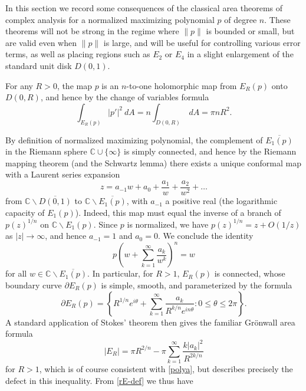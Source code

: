 \documentclass[12pt]{amsart}
\newcommand{\C}{\mathbb{C}}
\begin{document}
In this section we record some consequences of the classical area theorems of complex analysis for a normalized maximizing polynomial $p$ of degree $n$.  These theorems will not be strong in the regime where $\|p\|$ is bounded or small, but are valid even when $\|p\|$ is large, and will be useful for controlling various error terms, as well as placing regions such as $E_2$ or $E_4$ in a slight enlargement of the standard unit disk $D(0,1)$.

For any $R>0$, the map $p$ is an $n$-to-one holomorphic map from $E_R(p)$ onto $D(0,R)$, and hence by the change of variables formula
\begin{equation}\label{area-form}
    \int_{E_R(p)} |p'|^2\ dA = n \int_{D(0,R)}\ dA = \pi n R^2.
\end{equation}

By definition of normalized maximizing polynomial, the complement of $\overline{E_1(p)}$ in the Riemann sphere $\C \cup \{\infty\}$ is simply connected, and hence by the Riemann mapping theorem (and the Schwartz lemma) there exists a unique conformal map with a Laurent series expansion
$$ z = a_{-1} w + a_0 + \frac{a_1}{w} + \frac{a_2}{w^2} + \dots$$
from $\C \backslash \overline{D(0,1)}$ to $\C \backslash \overline{E_1(p)}$, with $a_{-1}$ a positive real (the logarithmic capacity of $E_1(p)$).  Indeed, this map must equal the inverse of a branch of $p(z)^{1/n}$ on $\C \backslash E_1(p)$.  Since $p$ is normalized, we have $p(z)^{1/n} = z + O(1/z)$ as $|z| \to \infty$, and hence $a_{-1}=1$ and $a_0=0$.  We conclude the identity
\begin{equation}\label{p-power}
 p\left( w + \sum_{k=1}^\infty \frac{a_k}{w^k} \right)^n = w
\end{equation}
for all $w \in \C \backslash \overline{E_1(p)}$.  In particular, for $R>1$, $E_R(p)$ is connected, whose boundary curve $\partial E_R(p)$ is simple, smooth, and parameterized by the formula
\begin{equation}\label{param}
\partial E_R(p) = \left\{ R^{1/n} e^{i\theta} + \sum_{k=1}^\infty \frac{a_k}{R^{k/n} e^{in\theta}}: 0 \leq \theta\leq 2\pi\right\}.
\end{equation}
A standard application of Stokes' theorem then gives the familiar Gr\"onwall area formula
\begin{equation}\label{area-formula}
    |E_R| = \pi R^{2/n} - \pi \sum_{k=1}^\infty \frac{k|a_k|^2}{R^{2k/n}}
\end{equation}
for $R>1$, which is of course consistent with \eqref{polya}, but describes precisely the defect in this inequality.  From \eqref{rE-def} we thus have
\end{document}
